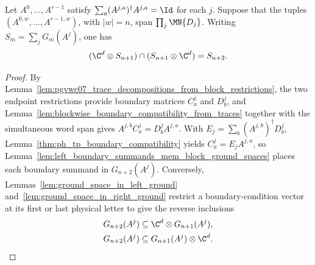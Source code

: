 \begin{lemma}
    \label{thm:ph_tp_block_intersection}
    \leanok
    Let $A^0,\ldots,A^{r-1}$ satisfy
    $\sum_a(A^{j,a})^\dagger A^{j,a}=\Id$ for each $j$.
    Suppose that the tuples $(A^{0,w},\ldots,A^{r-1,w})$, with $|w|=n$,
    span $\prod_j\MN{D_j}$. Writing $S_m=\sum_jG_m(A^j)$, one has
    \begin{align}
        (\C^d\otimes S_{n+1})\cap(S_{n+1}\otimes\C^d)=S_{n+2}.
        \notag
    \end{align}
\end{lemma}
\begin{proof}
    \leanok
    By Lemma~\ref{lem:pgvwc07_trace_decompositions_from_block_restrictions},
    the two endpoint restrictions provide boundary matrices $C_a^j$ and
    $D_b^j$, and Lemma~\ref{lem:blockwise_boundary_compatibility_from_traces}
    together with the simultaneous word span gives $A^{j,b}C_a^j=D_b^j A^{j,a}$.
    With $E_j=\sum_b(A^{j,b})^\dagger D_b^j$,
    Lemma~\ref{thm:ph_tp_boundary_compatibility} yields $C_a^j=E_jA^{j,a}$,
    so Lemma~\ref{lem:left_boundary_summands_mem_block_ground_spaces} places
    each boundary summand in $G_{n+2}(A^j)$.
    Conversely, Lemmas~\ref{lem:ground_space_in_left_ground}
    and~\ref{lem:ground_space_in_right_ground} restrict a boundary-condition
    vector at its first or last physical letter to give the reverse inclusions
    \begin{align}
        G_{n+2}(A^j) & \subseteq\C^d\otimes G_{n+1}(A^j),
        \notag                                            \\
        G_{n+2}(A^j) & \subseteq G_{n+1}(A^j)\otimes\C^d.
        \notag
    \end{align}
\end{proof}

